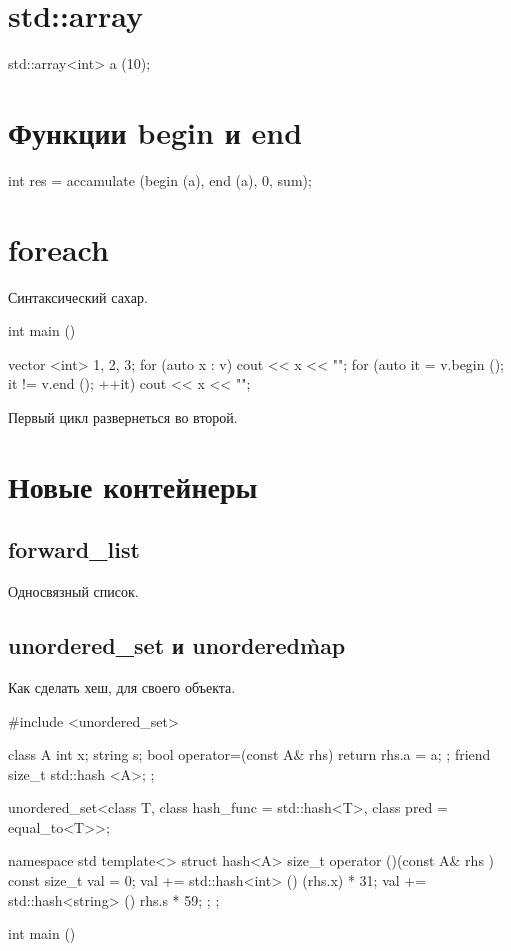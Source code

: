 \section{std::array}
\begin{cppcode}
std::array<int> a (10);
\end{cppcode}

\section{Функции begin и end}
\begin{cppcode}
int res = accamulate (begin (a), end (a), 0, sum);
\end{cppcode}

\section{foreach}
Синтаксический сахар.

\begin{cppcode}
int main () {
  vector <int> {1, 2, 3};
  for (auto x : v) {
    cout << x << "\n";
  }
  for (auto it = v.begin (); it != v.end (); ++it) {
   cout << x << "\n"; 
  }

}
\end{cppcode}

Первый цикл развернеться во второй.

\section{Новые контейнеры}

\subsection{forward\_list}
Односвязный список.

\subsection{unordered\_set и unordered\`map}
Как сделать хеш, для своего объекта. 
\begin{cppcode}

#include <unordered_set>

class A {
  int x;
  string s;
  bool operator=(const A& rhs) {
    return rhs.a = a;
  };
  friend size_t std::hash <A>;
};

unordered_set<class T, class hash_func = std::hash<T>, class pred = equal_to<T>>;

namespace std {
  template<>
  struct hash<A> {
    size_t operator ()(const A& rhs ) const {
      size_t val = 0;
      val += std::hash<int> () (rhs.x) * 31;
      val += std::hash<string> () rhs.s * 59;
    }
  };
};

int main () {


}
\end{cppcode}
          





